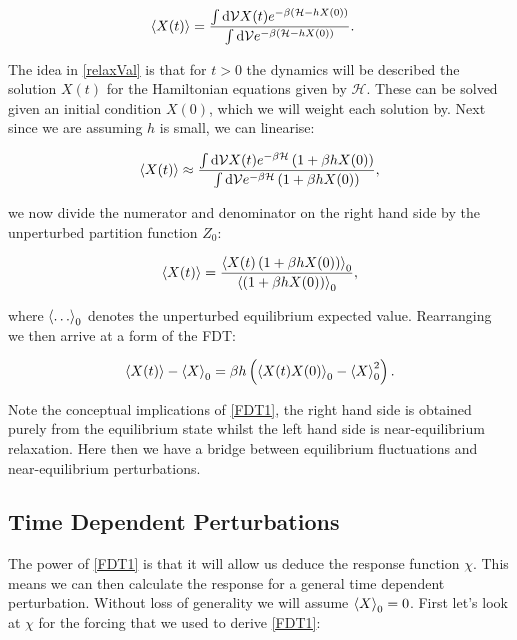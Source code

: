 \begin{align}
\expval{X(t)} &= \frac{\int \dd \mathcal{V} X(t) e^{-\beta \left( \mathcal{H}-hX(0) \right) }  }{\int \dd \mathcal{V} e^{-\beta \left( \mathcal{H}-hX(0) \right) }}. \label{relaxVal}
\end{align}

\noindent The idea in \ref{relaxVal} is that for $t >0$ the dynamics will be described the solution $X(t)$ for the Hamiltonian equations given by $\mathcal{H}$. These can be solved given an initial condition $X(0)$, which we will weight each solution by. Next since we are assuming $h$ is small, we can linearise:

\begin{align}
\expval{X(t)} \approx \frac{\int \dd \mathcal{V} X(t) e^{-\beta \mathcal{H} } \left(1 +\beta h X(0) \right)  }{\int \dd \mathcal{V} e^{-\beta\mathcal{H} } \left(1 +\beta h X(0) \right)},
\end{align}

\noindent we now divide the numerator and denominator on the right hand side by the unperturbed partition function $Z_0$:

\begin{align}
\expval{X(t)} = \frac{\expval{X(t) \left(1 +\beta h X(0) \right) }_0}{\expval{\left(1 +\beta h X(0) \right)}_0},
\end{align}

\noindent where $\expval{ \ldots }_0$ denotes the unperturbed equilibrium expected value. Rearranging we then arrive at a form of the FDT:

\begin{align}
\expval{X(t)} - \expval{X}_0 = \beta h \left( \expval{X(t)X(0)}_0 - \expval{X}_0 ^2 \right).\label{FDT1}
\end{align}

Note the conceptual implications of \ref{FDT1}, the right hand side is obtained purely from the equilibrium state whilst the left hand side is near-equilibrium relaxation. Here then we have a bridge between equilibrium fluctuations and near-equilibrium perturbations. 

\subsection{Time Dependent Perturbations}

The power of \ref{FDT1} is that it will allow us deduce the response function $\chi$. This means we can then calculate the response for a general time dependent perturbation.  Without loss of generality we will assume $\expval{X}_0 = 0$. First let's look at $\chi$ for the forcing that we used to derive \ref{FDT1}:

